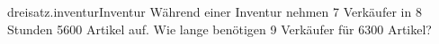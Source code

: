 \begin{exercise}{dreisatz.inventur}{Inventur}
  \ifproblem\problem
    Während einer Inventur nehmen 7 Verkäufer in 8 Stunden \num{5600} Artikel auf.
    Wie lange benötigen 9 Verkäufer für \num{6300} Artikel?
  \fi
\end{exercise}
